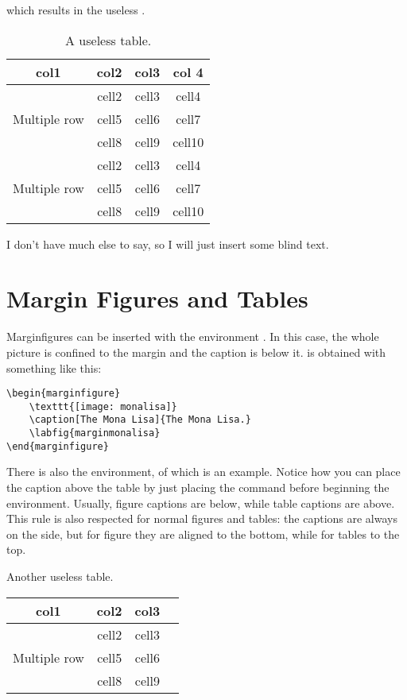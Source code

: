 which results in the useless .

\begin{table}[h]
\caption[A useless table]{A useless table.}
\begin{tabular}{ c c c c }
	\toprule
	col1 & col2 & col3 & col 4 \\
	\midrule
	\multirow{3}{4em}{Multiple row} & cell2 & cell3 & cell4\\ &
	cell5 & cell6 & cell7 \\ &
	cell8 & cell9 & cell10 \\
	\multirow{3}{4em}{Multiple row} & cell2 & cell3 & cell4 \\ &
	cell5 & cell6 & cell7 \\ &
	cell8 & cell9 & cell10 \\
	\bottomrule
\end{tabular}
\end{table}

I don't have much else to say, so I will just insert some blind text. 
\blindtext

\section{Margin Figures and Tables}

Marginfigures can be inserted with the environment 
. In this case, the whole picture is confined 
to the margin and the caption is below it.  is 
obtained with something like this:

\begin{lstlisting}[caption={Another caption.}]
\begin{marginfigure}
	\texttt{[image: monalisa]}
	\caption[The Mona Lisa]{The Mona Lisa.}
	\labfig{marginmonalisa}
\end{marginfigure}
\end{lstlisting}

There is also the  environment, of which 
 is an example. Notice how you can place the 
caption above the table by just placing the  command 
before beginning the  environment. Usually, figure 
captions are below, while table captions are above. This rule is also 
respected for normal figures and tables: the captions are always on the 
side, but for figure they are aligned to the bottom, while for tables to 
the top.

\begin{margintable}
\caption[Another useless table]{Another useless table.}
\raggedright
\begin{tabular}{ c c c c }
	\hline
	col1 & col2 & col3 \\
	\hline
	\multirow{3}{4em}{Multiple row} & cell2 & cell3 \\ & cell5 & cell6 
	\\ & cell8 & cell9 \\ \hline
\end{tabular}
\end{margintable}

